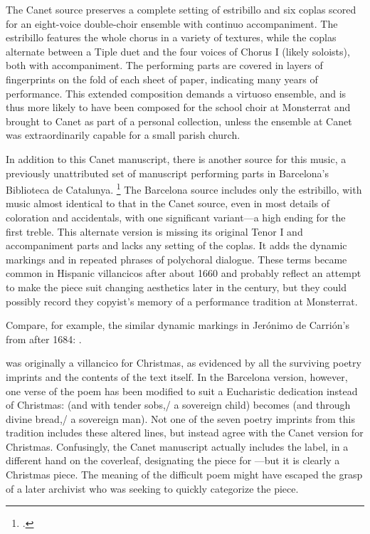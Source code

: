 The Canet source preserves a complete setting of estribillo and six coplas
scored for an eight-voice double-choir ensemble with continuo accompaniment.
The estribillo features the whole chorus in a variety of textures, while the
coplas alternate between a Tiple duet and the four voices of Chorus I (likely
soloists), both with accompaniment.
The performing parts are covered in layers of fingerprints on the fold of each
sheet of paper, indicating many years of performance.
This extended composition demands a virtuoso ensemble, and is thus more likely
to have been composed for the school choir at Monsterrat and brought to Canet as
part of a personal collection, unless the ensemble at Canet was extraordinarily
capable for a small parish church.

In addition to this Canet manuscript, there is another source for this music, a
previously unattributed set of manuscript performing parts in Barcelona's
Biblioteca de Catalunya.%
    \footnote{.}
The Barcelona source includes only the estribillo, with music almost identical
to that in the Canet source, even in most details of coloration and accidentals,
with one significant variant---a  high ending for the first treble.
This alternate version is missing its original Tenor I and accompaniment parts
and lacks any setting of the coplas.
It adds the dynamic markings  and  in repeated phrases
of polychoral dialogue. 
These terms became common in Hispanic villancicos after about 1660 and probably
reflect an attempt to make the piece suit changing aesthetics later in the
century, but they could possibly record they copyist's memory of a performance
tradition at Monsterrat.%
\begin{Footnote}
    Compare, for example, the similar dynamic markings in Jerónimo de Carrión's
     from after 1684: 
    \autocite[331--336]{Cashner:PhD}.
\end{Footnote}

 was originally a villancico for Christmas, as
evidenced by all the surviving poetry imprints and the contents of the text
itself.
In the Barcelona version, however, one verse of the poem has been modified to
suit a Eucharistic dedication instead of Christmas:  (and with tender sobs,/ a sovereign child) becomes
 (and through divine bread,/
a sovereign man).
Not one of the seven poetry imprints from this tradition includes these altered
lines, but instead agree with the Canet version for Christmas.
Confusingly, the Canet manuscript actually includes the label, in a different
hand on the coverleaf, designating the piece for ---but it is clearly a Christmas piece.
The meaning of the difficult poem might have escaped the grasp of a later
archivist who was seeking to quickly categorize the piece.

